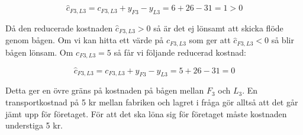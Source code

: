 \documentclass[titlepage, a4paper]{article}
\begin{document}
\begin{displaymath}
\hat{c}_{F3,L3} = c_{F3,L3} + y_{F3} - y_{L3} = 6 + 26 - 31 = 1 > 0
\end{displaymath}

Då den reducerade kostnaden $\hat{c}_{F3,L3} > 0$ så är det ej lönsamt att skicka flöde genom bågen. Om vi kan hitta ett värde på $c_{F3,L3}$ som ger att $\hat{c}_{F3,L3} < 0$ så blir bågen lönsam. Om $c_{F3,L3} = 5$ så får vi följande reducerad kostnad:

\begin{displaymath}
\hat{c}_{F3,L3} = c_{F3,L3} + y_{F3} - y_{L3} = 5 + 26 - 31 = 0
\end{displaymath}

Detta ger en övre gräns på kostnaden på bågen mellan $F_{3}$ och $L_{3}$. En transportkostnad på 5 kr mellan fabriken och lagret i fråga gör alltså att det går jämt upp för företaget. För att det ska löna sig för företaget måste kostnaden understiga 5 kr.
\end{document}
